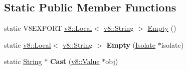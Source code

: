 \subsection*{Static Public Member Functions}
\begin{DoxyCompactItemize}
\item 
static V8\+E\+X\+P\+O\+R\+T \hyperlink{classv8_1_1_local}{v8\+::\+Local}$<$ \hyperlink{classv8_1_1_string}{v8\+::\+String} $>$ \hyperlink{classv8_1_1_string_a148c0f01dca1c477eba42717068a2c7e}{Empty} ()
\item 
\hypertarget{classv8_1_1_string_aa393d47baa54467fe57001065e49194b}{}static \hyperlink{classv8_1_1_local}{v8\+::\+Local}$<$ \hyperlink{classv8_1_1_string}{v8\+::\+String} $>$ {\bfseries Empty} (\hyperlink{classv8_1_1_isolate}{Isolate} $\ast$isolate)\label{classv8_1_1_string_aa393d47baa54467fe57001065e49194b}

\item 
\hypertarget{classv8_1_1_string_a826d60798dc152cea64a7636737b03b9}{}static \hyperlink{classv8_1_1_string}{String} $\ast$ {\bfseries Cast} (\hyperlink{classv8_1_1_value}{v8\+::\+Value} $\ast$obj)\label{classv8_1_1_string_a826d60798dc152cea64a7636737b03b9}


\end{DoxyCompactItemize}
